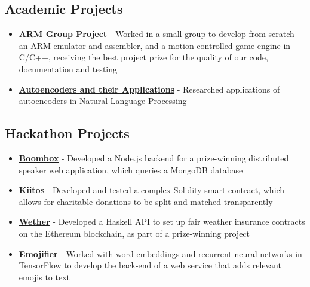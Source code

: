 \documentclass[a4paper]{article}
\begin{document}
\begin{minipage}[t]{.66\textwidth}
\subsection*{Academic Projects}
\begin{itemize}
\item \textbf{\href{https://github.com/ic-projects/arm11}{ARM Group Project}} - Worked in a small group to develop from scratch an ARM emulator and assembler, and a motion-controlled game engine in C/C++, receiving the best project prize for the quality of our code, documentation and testing
\item \textbf{\href{https://www.doc.ic.ac.uk/~js4416/163/website/}{Autoencoders and their Applications}} - Researched applications of autoencoders in Natural Language Processing
\end{itemize}

\subsection*{Hackathon Projects}
\begin{itemize}
	\item \textbf{\href{https://devpost.com/software/boombox-s7zmce}{Boombox}} - Developed a Node.js backend for a prize-winning distributed speaker web application, which queries a MongoDB database
	\item \textbf{\href{https://devpost.com/software/kiitos}{Kiitos}} - Developed and tested a complex Solidity smart contract, which allows for charitable donations to be split and matched transparently
	\item \textbf{\href{https://devpost.com/software/weather-g8lp3r}{Wether}} - Developed a Haskell API to set up fair weather insurance contracts on the Ethereum blockchain, as part of a prize-winning project
	\item \textbf{\href{https://devpost.com/software/emojifier}{Emojifier}} - Worked with word embeddings and recurrent neural networks in TensorFlow to develop the back-end of a web service that adds relevant emojis to text
\end{itemize}

\end{minipage}%
\hspace{.02\textwidth}
\end{document}
